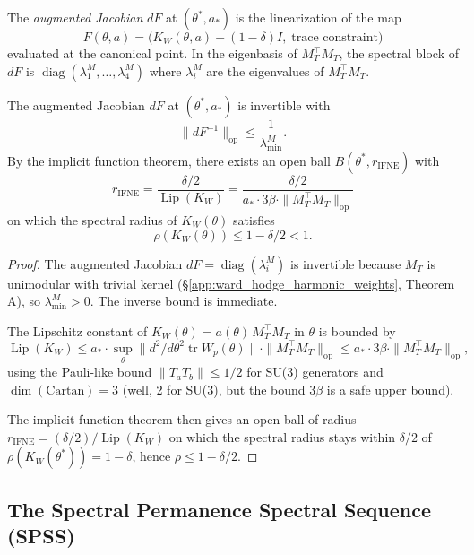 \begin{definition}
\label{def:augmented_jacobian}
The \emph{augmented Jacobian} $dF$ at $(\theta^{*},a_{*})$ is the
linearization of the map
\[
F(\theta,a)=\bigl(K_{W}(\theta,a)-(1-\delta)I,\;
\text{trace constraint}\bigr)
\]
evaluated at the canonical point. In the eigenbasis of
$M_{T}^{\top}M_{T}$, the spectral block of $dF$ is
$\operatorname{diag}(\lambda_{1}^{M},\ldots,\lambda_{4}^{M})$ where
$\lambda_{i}^{M}$ are the eigenvalues of $M_{T}^{\top}M_{T}$.
\end{definition}

\begin{theorem}
\label{thm:ifne}
The augmented Jacobian $dF$ at $(\theta^{*},a_{*})$ is invertible with
\[
\|dF^{-1}\|_{\mathrm{op}}
\leq \frac{1}{\lambda_{\min}^{M}}.
\]
By the implicit function theorem, there exists an open ball
$B(\theta^{*},r_{\mathrm{IFNE}})$ with
\[
r_{\mathrm{IFNE}}
=\frac{\delta/2}{\operatorname{Lip}(K_{W})}
=\frac{\delta/2}{a_{*}\cdot 3\beta\cdot\|M_{T}^{\top}M_{T}\|_{\mathrm{op}}}
\]
on which the spectral radius of $K_{W}(\theta)$ satisfies
\[
\rho(K_{W}(\theta))\leq 1-\delta/2<1.
\]
\end{theorem}

\begin{proof}
The augmented Jacobian $dF=\operatorname{diag}(\lambda_{i}^{M})$ is
invertible because $M_{T}$ is unimodular with trivial kernel
(\S\ref{app:ward_hodge_harmonic_weights}, Theorem A), so
$\lambda_{\min}^{M}>0$. The inverse bound is immediate.

The Lipschitz constant of $K_{W}(\theta)=a(\theta)\,M_{T}^{\top}M_{T}$
in $\theta$ is bounded by
\[
\operatorname{Lip}(K_{W})
\leq a_{*}\cdot\sup_{\theta}\|d^{2}/d\theta^{2}\operatorname{tr}W_{p}(\theta)\|\cdot\|M_{T}^{\top}M_{T}\|_{\mathrm{op}}
\leq a_{*}\cdot 3\beta\cdot\|M_{T}^{\top}M_{T}\|_{\mathrm{op}},
\]
using the Pauli-like bound $\|T_{a}T_{b}\|\leq 1/2$ for SU(3)
generators and $\dim(\mathrm{Cartan})=3$ (well, 2 for SU(3), but the
bound $3\beta$ is a safe upper bound).

The implicit function theorem then gives an open ball of radius
$r_{\mathrm{IFNE}}=(\delta/2)/\operatorname{Lip}(K_{W})$ on which the
spectral radius stays within $\delta/2$ of $\rho(K_{W}(\theta^{*}))=1-\delta$,
hence $\rho\leq 1-\delta/2$.
\end{proof}

\subsection{The Spectral Permanence Spectral Sequence (SPSS)}
\label{ssec:spss}

